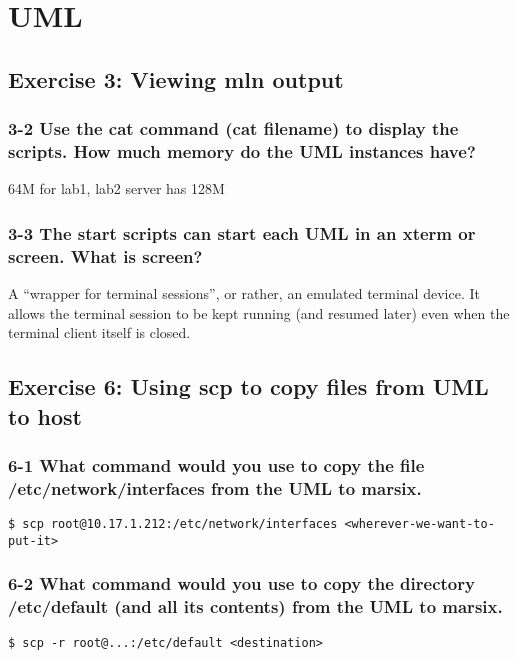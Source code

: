 
\chapter{UML}
\section{Exercise 3: Viewing mln output}

\subsection{3-2 Use the cat command (cat filename) to display the scripts. How much memory do the UML instances have?}
64M for lab1, lab2 server has 128M

\subsection{3-3 The start scripts can start each UML in an xterm or screen. What is screen?}
A ``wrapper for terminal sessions'', or rather, an emulated terminal device. It allows the terminal session to be kept running (and resumed later) even when the terminal client itself is closed.
\section{Exercise 6: Using scp to copy files from UML to host}
\subsection{6-1 What command would you use to copy the file /etc/network/interfaces from the UML to marsix.}
\verb=$ scp root@10.17.1.212:/etc/network/interfaces <wherever-we-want-to-put-it>=

\subsection{6-2 What command would you use to copy the directory /etc/default (and all its contents) from the UML to marsix.}
\verb=$ scp -r root@...:/etc/default <destination>=

